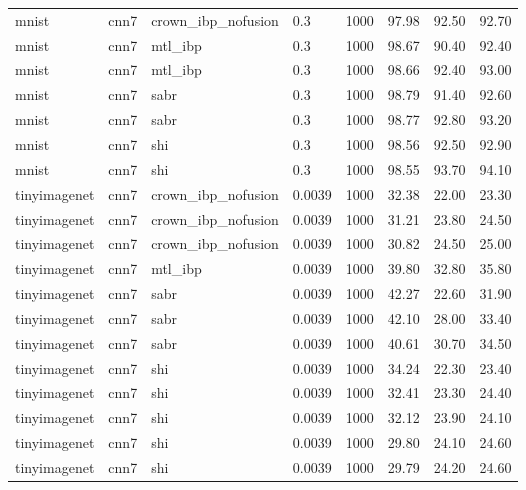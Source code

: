 \begin{tabular}{llllllll}
mnist & cnn7 & crown\_ibp\_nofusion & 0.3 & 1000 & 97.98 & 92.50 & 92.70 \\
mnist & cnn7 & mtl\_ibp & 0.3 & 1000 & 98.67 & 90.40 & 92.40 \\
mnist & cnn7 & mtl\_ibp & 0.3 & 1000 & 98.66 & 92.40 & 93.00 \\
mnist & cnn7 & sabr & 0.3 & 1000 & 98.79 & 91.40 & 92.60 \\
mnist & cnn7 & sabr & 0.3 & 1000 & 98.77 & 92.80 & 93.20 \\
mnist & cnn7 & shi & 0.3 & 1000 & 98.56 & 92.50 & 92.90 \\
mnist & cnn7 & shi & 0.3 & 1000 & 98.55 & 93.70 & 94.10 \\
tinyimagenet & cnn7 & crown\_ibp\_nofusion & 0.0039 & 1000 & 32.38 & 22.00 & 23.30 \\
tinyimagenet & cnn7 & crown\_ibp\_nofusion & 0.0039 & 1000 & 31.21 & 23.80 & 24.50 \\
tinyimagenet & cnn7 & crown\_ibp\_nofusion & 0.0039 & 1000 & 30.82 & 24.50 & 25.00 \\
tinyimagenet & cnn7 & mtl\_ibp & 0.0039 & 1000 & 39.80 & 32.80 & 35.80 \\
tinyimagenet & cnn7 & sabr & 0.0039 & 1000 & 42.27 & 22.60 & 31.90 \\
tinyimagenet & cnn7 & sabr & 0.0039 & 1000 & 42.10 & 28.00 & 33.40 \\
tinyimagenet & cnn7 & sabr & 0.0039 & 1000 & 40.61 & 30.70 & 34.50 \\
tinyimagenet & cnn7 & shi & 0.0039 & 1000 & 34.24 & 22.30 & 23.40 \\
tinyimagenet & cnn7 & shi & 0.0039 & 1000 & 32.41 & 23.30 & 24.40 \\
tinyimagenet & cnn7 & shi & 0.0039 & 1000 & 32.12 & 23.90 & 24.10 \\
tinyimagenet & cnn7 & shi & 0.0039 & 1000 & 29.80 & 24.10 & 24.60 \\
tinyimagenet & cnn7 & shi & 0.0039 & 1000 & 29.79 & 24.20 & 24.60 \\
\bottomrule
\end{tabular}